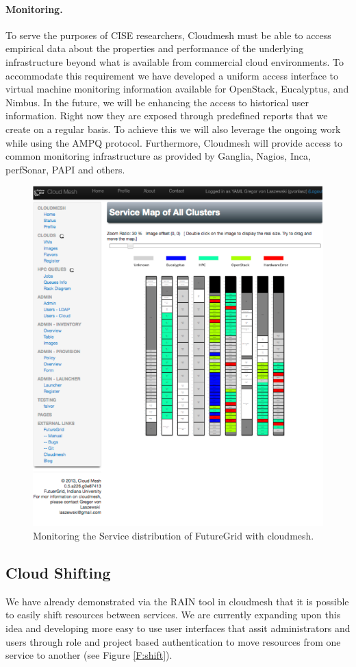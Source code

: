 \documentclass{article}
\begin{document}
\paragraph{Monitoring.}

To serve the purposes of CISE researchers, Cloudmesh must be able to access empirical data about the properties and performance of the underlying infrastructure beyond what is available from commercial cloud environments. To accommodate this requirement we have developed a uniform access interface to virtual machine monitoring information available for OpenStack, Eucalyptus, and Nimbus. In the future, we will be enhancing the access to historical user information. Right now they are exposed through predefined reports that we create on a regular basis. To achieve this we will also leverage the ongoing work while using the AMPQ protocol. Furthermore, Cloudmesh will provide access to common monitoring infrastructure as provided by Ganglia, Nagios, Inca, perfSonar, PAPI and others.

\begin{figure}[h!]
  \centering
    \includegraphics[width=.7\textwidth]{images/rainbow.pdf}
  \caption{Monitoring the Service distribution of FutureGrid with cloudmesh.}
\end{figure}

\subsection{Cloud Shifting}

We have already demonstrated via the RAIN tool in cloudmesh that it is
possible to easily shift resources between services. We are currently
expanding upon this idea and developing more easy to use user
interfaces that assit administrators and users through role and
project based authentication to move resources from one service to
another (see Figure \ref{F:shift}).
\end{document}
